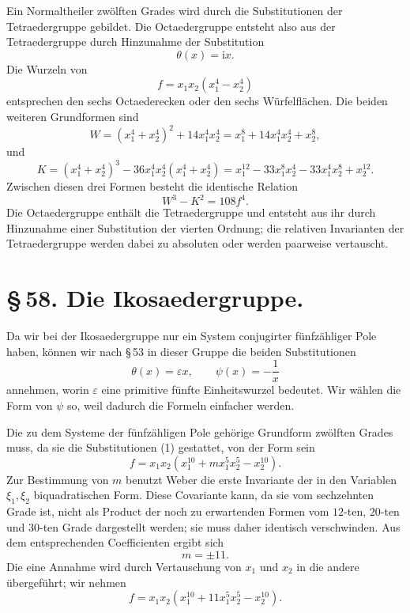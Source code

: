 \documentclass[11pt]{article}
\providecommand{\eps}{\varepsilon}
\providecommand{\ii}{\mathrm{i}}
\providecommand{\eps}{\varepsilon}
\begin{document}
Ein Normaltheiler zwölften Grades wird durch die Substitutionen der Tetraedergruppe gebildet. Die Octaedergruppe entsteht also aus der Tetraedergruppe durch Hinzunahme der Substitution
\[
 \theta(x)=\ii x .
\]
Die Wurzeln von
\[
 f=x_1x_2(x_1^4-x_2^4)
\]
entsprechen den sechs Octaederecken oder den sechs Würfelflächen. Die beiden weiteren Grundformen sind
\begin{equation}
 W=(x_1^4+x_2^4)^2+14x_1^4x_2^4
   =x_1^8+14x_1^4x_2^4+x_2^8,
\tag{6}
\end{equation}
und
\begin{equation}
 K=(x_1^4+x_2^4)^3-36x_1^4x_2^4(x_1^4+x_2^4)
   =x_1^{12}-33x_1^8x_2^4-33x_1^4x_2^8+x_2^{12}.
\tag{7}
\end{equation}
Zwischen diesen drei Formen besteht die identische Relation
\begin{equation}
 W^3-K^2=108 f^4 .
\tag{8}
\end{equation}
Die Octaedergruppe enthält die Tetraedergruppe und entsteht aus ihr durch Hinzunahme einer Substitution der vierten Ordnung; die relativen Invarianten der Tetraedergruppe werden dabei zu absoluten oder werden paarweise vertauscht.

\section*{\S\,58. Die Ikosaedergruppe.}

Da wir bei der Ikosaedergruppe nur ein System conjugirter fünfzähliger Pole haben, können wir nach \S\,53 in dieser Gruppe die beiden Substitutionen
\begin{equation}
 \theta(x)=\eps x,\qquad \psi(x)=-\frac1x
\tag{1}
\end{equation}
annehmen, worin $\eps$ eine primitive fünfte Einheitswurzel bedeutet. Wir wählen die Form von $\psi$ so, weil dadurch die Formeln einfacher werden.

Die zu dem Systeme der fünfzähligen Pole gehörige Grundform zwölften Grades muss, da sie die Substitutionen (1) gestattet, von der Form sein
\begin{equation}
 f=x_1x_2(x_1^{10}+m x_1^5x_2^5-x_2^{10}).
\tag{2}
\end{equation}
Zur Bestimmung von $m$ benutzt Weber die erste Invariante der in den Variablen $\xi_1,\xi_2$ biquadratischen Form. Diese Covariante kann, da sie vom sechzehnten Grade ist, nicht als Product der noch zu erwartenden Formen vom $12$-ten, $20$-ten und $30$-ten Grade dargestellt werden; sie muss daher identisch verschwinden. Aus dem entsprechenden Coefficienten ergibt sich
\[
 m=\pm 11.
\]
Die eine Annahme wird durch Vertauschung von $x_1$ und $x_2$ in die andere übergeführt; wir nehmen
\begin{equation}
 f=x_1x_2(x_1^{10}+11x_1^5x_2^5-x_2^{10}).
\tag{3}
\end{equation}
\end{document}
